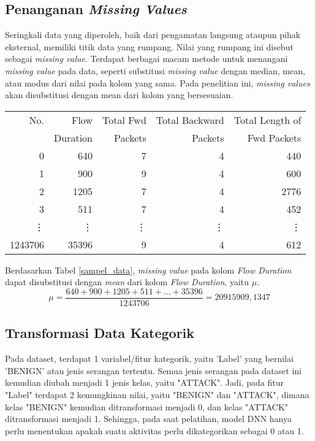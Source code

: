 \documentclass[a4paper,12pt]{report}
\begin{document}
\subsection{Penanganan \textit{Missing Values}}
Seringkali data yang diperoleh, baik dari pengamatan langsung ataupun pihak eksternal, memiliki titik data yang rumpang. Nilai yang rumpang ini disebut sebagai \textit{missing value}. Terdapat berbagai macam metode untuk menangani \textit{missing value} pada data, seperti substitusi \textit{missing value} dengan median, mean, atau modus dari nilai pada kolom yang sama. Pada penelitian ini, \textit{missing values} akan disubstitusi dengan mean dari kolom yang bersesuaian. \\ 
\begin{table}
	\centering
	\caption{Sampel Data Aktivitas Jaringan}
	\label{sampel_data}
	\begin{longtable}{|r|r|r|r|r|}
		\hline
		No. & Flow & Total Fwd & Total Backward & Total Length of  \\
		 & Duration & Packets & Packets & Fwd Packets \\
		\hline
		0 & 640 & 7 & 4 & 440  \\
		\hline
		1 & 900 & 9 & 4 & 600  \\
		\hline
		2 & 1205 & 7 & 4 & 2776 \\
		\hline
		3 & 511 & 7 & 4 & 452 \\
		\hline
		\vdots & \vdots & \vdots & \vdots & \vdots \\
		\hline
		1243706 & 35396 & 9 & 4 & 612 \\
		\hline
	\end{longtable}
\end{table}

Berdasarkan Tabel \ref{sampel_data}, \textit{missing value} pada kolom \textit{Flow Duration} dapat disubstitusi dengan \textit{mean} dari kolom \textit{Flow Duration}, yaitu $\mu$.
\begin{equation}
	\mu = \frac{640 + 900 + 1205 + 511 + ...  + 35396}{1243706} = 20915909,1347
	\label{mean_flow}
\end{equation}

\subsection{Transformasi Data Kategorik}
Pada dataset, terdapat 1 variabel/fitur kategorik, yaitu 'Label' yang bernilai 'BENIGN' atau jenis serangan tertentu. Semua jenis serangan pada dataset ini kemudian diubah menjadi 1 jenis kelas, yaitu "ATTACK". Jadi, pada fitur "Label" terdapat 2 kemungkinan nilai, yaitu "BENIGN" dan "ATTACK", dimana kelas "BENIGN" kemudian ditransformasi menjadi 0, dan kelas "ATTACK" ditransformasi menjadi 1. Sehingga, pada saat pelatihan, model DNN hanya perlu menentukan apakah suatu aktivitas perlu dikategorikan sebagai 0 atau 1.
\end{document}

